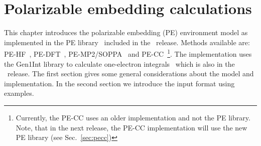 \chapter{Polarizable embedding calculations}\label{ch:embedding}

This chapter introduces the polarizable embedding (PE) environment
model as implemented in the PE library~\cite{pelib2012} included in the 
\latestrelease\ release. Methods available are: PE-HF~\cite{pescf}, 
PE-DFT~\cite{pescf}, PE-MP2/SOPPA~\cite{pesoppa} and 
PE-CC~\cite{pecc}\footnote{Currently, the PE-CC uses an older implementation 
and not the PE 
library. Note, that in the next release, the PE-CC
implementation will use the new PE library (see Sec.~\ref{sec:pecc})}. 
The implementation uses the Gen1Int library to calculate one-electron
integrals~\cite{gen1int} which is also in the \latestrelease\ release. The
first section gives some general considerations about the model and 
implementation. In the second section we introduce the input format using
examples.

\begin{center}
\end{center}

